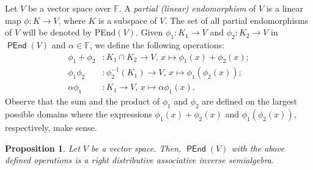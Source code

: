 \documentclass[10pt,a4paper]{amsart}
\newtheorem{prop}[thm]{Proposition}
\theoremstyle{definition}
\theoremstyle{remark}
\numberwithin{equation}{section}
\newtheorem*{Theorem A}{\textbf{Theorem A}}
\newtheorem*{Corollary E}{\textbf{Corollary E}}
\newtheorem*{Corollary F}{\textbf{Corollary F}}
\newtheorem*{Theorem B}{\textbf{Theorem B}}
\newtheorem*{Theorem C}{\textbf{Theorem C}}
\newtheorem*{Theorem D}{\textbf{Theorem B}}
\newtheorem*{p a}{\textbf{Proof of  Theorem A}}
\newtheorem*{p b}{\textbf{Proof of Theorem B}}
\newtheorem*{p c}{\textbf{Proof of  Theorem C}}
\newtheorem*{p d}{\textbf{Proof of  Theorem D}}
\newcommand{\F}{\mathbb{F}}
\newcommand{\0}{{\vartheta}}
\DeclareMathOperator{\pen}{\textsf{PEnd}}
\begin{document}
		

 


Let $V$ be a vector space over $\mathbb{F}.$ A {\em partial (linear) endomorphism} of $V$ is a linear map $\phi: K\to V$, where $K$ is a subspace of $V$. The set of all partial endomorphisms of $V$ will be denoted by {\sf PEnd}$(V)$. Given   $\phi_1: K_1\to V$ and $\phi_2: K_2\to V$ in $\pen(V)$ and $\alpha\in \F$, we define the following operations:
\begin{align*}
   \phi_1+\phi_2 &: K_1\cap K_2\to V, \,x\mapsto \phi_1(x)+\phi_2(x); \\
   \phi_1\phi_2 &: \phi_2^{-1}(K_1)\to V, \, x\mapsto \phi_1(\phi_2(x));\\
   \alpha\phi_1 &: K_1\to V, \, x\mapsto \alpha\phi_1(x).
\end{align*}
Observe that the sum and the product of  $\phi_1$ and $\phi_2$ are defined on the largest possible domains  where the expressions $\phi_1(x)+\phi_2(x)$ and $\phi_1(\phi_2(x))$, respectively,  make sense. 
\begin{prop}\label{p20}
Let $V$ be a vector space. Then,  $\pen(V)$ with the above defined operations  is a right distributive associative inverse semialgebra.
\end{prop}
\end{document}
